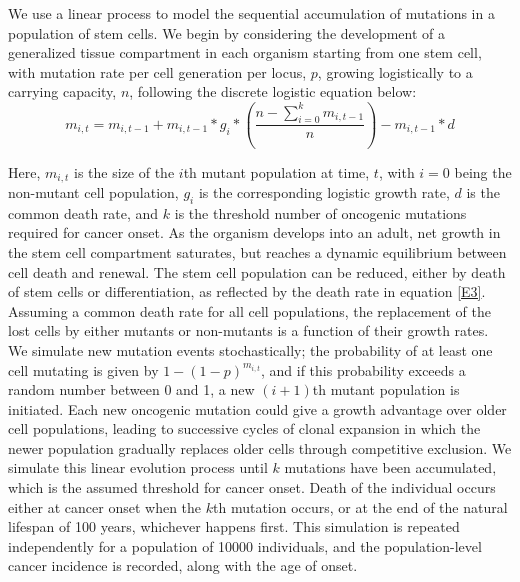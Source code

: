 \documentclass[9pt,twocolumn,twoside]{pnas-new}
\begin{document}
We use a linear process to model the sequential accumulation of mutations in a population of stem cells. We begin by considering the development of a generalized tissue compartment in each organism starting from one stem cell, with mutation rate per cell generation per locus, $p$, growing logistically to a carrying capacity, $n$, following the discrete logistic equation below:
\begin{equation}
	m_{i, t} = m_{i, t-1} + m_{i, t-1}*g_{i}*(\dfrac{n-\sum_{i=0}^{k} m_{i, t-1}}{n}) - m_{i, t-1}*d
	\label{E3}	
\end{equation}

Here, $m_{i, t}$ is the size of the $i$th mutant population at time, $t$, with $i=0$ being the non-mutant cell population, $g_{i}$ is the corresponding logistic growth rate, $d$ is the common death rate, and $k$ is the threshold number of oncogenic mutations required for cancer onset. As the organism develops into an adult, net growth in the stem cell compartment saturates, but reaches a dynamic equilibrium between cell death and renewal. The stem cell population can be reduced, either by death of stem cells or differentiation, as reflected by the death rate in equation \ref{E3}. Assuming a common death rate for all cell populations, the replacement of the lost cells by either mutants or non-mutants is a function of their growth rates. We simulate new mutation events stochastically; the probability of at least one cell mutating is given by $1-(1-p)^{m_{i, t}}$, and if this probability exceeds a random number between 0 and 1, a new $(i+1)$th mutant population is initiated. Each new oncogenic mutation could give a growth advantage over older cell populations, leading to successive cycles of clonal expansion in which the newer population gradually replaces older cells through competitive exclusion. We simulate this linear evolution process until $k$ mutations have been accumulated, which is the assumed threshold for cancer onset. Death of the individual occurs either at cancer onset when the $k$th mutation occurs, or at the end of the natural lifespan of 100 years, whichever happens first. This simulation is repeated independently for a population of 10000 individuals, and the population-level cancer incidence is recorded, along with the age of onset.
\end{document}

